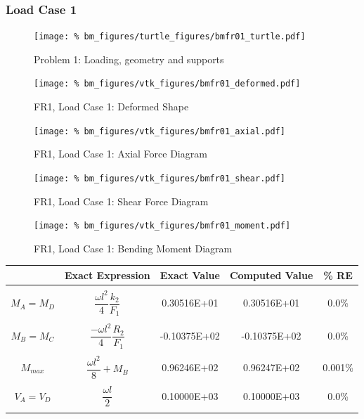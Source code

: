 \subsubsection{Load Case 1}
\begin{figure}[h]
    \texttt{[image: \%
                            bm\_figures/turtle\_figures/bmfr01\_turtle.pdf]}
    \centering
    \caption{Problem 1: Loading, geometry and supports}
    \label{fig:bmfr01_turtle}
\end{figure}


\begin{figure}[!htb]
    \texttt{[image: \%
                     bm\_figures/vtk\_figures/bmfr01\_deformed.pdf]}
    \centering
    \caption{FR1, Load Case 1: Deformed Shape}
    \label{fig:bmfr01_deformed}
\end{figure}
\begin{figure}[!htb]
    \texttt{[image: \%
                     bm\_figures/vtk\_figures/bmfr01\_axial.pdf]}
    \centering
    \caption{FR1, Load Case 1: Axial Force Diagram}
    \label{fig:bmfr01_shear}
\end{figure}
\begin{figure}[!htb]
    \texttt{[image: \%
                     bm\_figures/vtk\_figures/bmfr01\_shear.pdf]}
    \centering
    \caption{FR1, Load Case 1: Shear Force Diagram}
    \label{fig:bmfr01_shear}
\end{figure}
\begin{figure}[!htb]
    \texttt{[image: \%
                     bm\_figures/vtk\_figures/bmfr01\_moment.pdf]}
    \centering
    \caption{FR1, Load Case 1: Bending Moment Diagram}
    \label{fig:bmfr01_moment}
\end{figure}
\begin{table}[h!]
\centering
\begin{tabular}{ c| c c c c }
    & Exact Expression & Exact Value & Computed Value & \% RE \\ \hline \\
    $M_A=M_D$   & $\dfrac{\omega l^2}{4}\dfrac{k_2}{F_1}$ &  0.30516E+01 & 0.30516E+01 & 0.0\% \\ \\
    $M_B=M_C$   & $\dfrac{-\omega l^2}{4}\dfrac{R_2}{F_1}$ &  -0.10375E+02 & -0.10375E+02 & 0.0\% \\ \\
    $M_{max}$   & $\dfrac{\omega l^2}{8} + M_B$ &  0.96246E+02 & 0.96247E+02 & 0.001\% \\ \\
    $V_A=V_D$   & $\dfrac{\omega l}{2}$ &  0.10000E+03 & 0.10000E+03 & 0.0\% \\ \\
\end{tabular}
\end{table}

